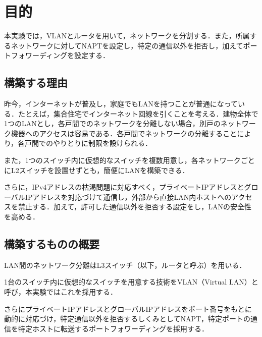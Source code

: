 \section{目的}
本実験では，VLANとルータを用いて，ネットワークを分割する．また，所属するネットワークに対してNAPTを設定し，特定の通信以外を拒否し，加えてポートフォワーディングを設定する．
\subsection{構築する理由}
昨今，インターネットが普及し，家庭でもLANを持つことが普通になっている．たとえば，集合住宅でインターネット回線を引くことを考える．建物全体で1つのLANとし，各戸間でのネットワークを分離しない場合，別戸のネットワーク機器へのアクセスは容易である．各戸間でネットワークの分離することにより，各戸間でのやりとりに制限を設けられる．\par
また，1つのスイッチ内に仮想的なスイッチを複数用意し，各ネットワークごとにL2スイッチを設置せずとも，簡便にLANを構築できる．\par
さらに，IPv4アドレスの枯渇問題に対応すべく，プライベートIPアドレスとグローバルIPアドレスを対応づけて通信し，外部から直接LAN内ホストへのアクセスを禁止する．加えて，許可した通信以外を拒否する設定をし，LANの安全性を高める．
\subsection{構築するものの概要}
LAN間のネットワーク分離はL3スイッチ（以下，ルータと呼ぶ）を用いる．\par
1台のスイッチ内に仮想的なスイッチを用意する技術をVLAN（Virtual LAN）と呼び，本実験ではこれを採用する．\par
さらにプライベートIPアドレスとグローバルIPアドレスをポート番号をもとに動的に対応づけ，特定通信以外を拒否するしくみとしてNAPT，特定ポートの通信を特定ホストに転送するポートフォワーディングを採用する．